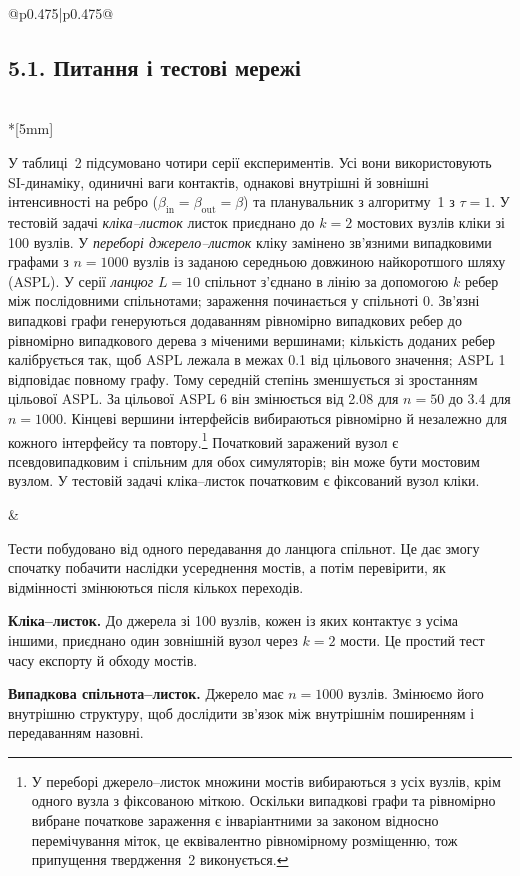 \documentclass[11pt]{article}
\begin{document}
\begin{longtable}{@{}p{0.475\textwidth}|p{0.475\textwidth}@{}}
\begin{minipage}[t]{\linewidth}
\subsection*{5.1. Питання і тестові мережі}
\end{minipage} \\*[5mm]
\begin{minipage}[t]{\linewidth}
У таблиці~2 підсумовано чотири серії експериментів. Усі вони використовують SI-динаміку, одиничні ваги контактів, однакові внутрішні й зовнішні інтенсивності на ребро ($\beta_{\mathrm{in}}=\beta_{\mathrm{out}}=\beta$) та планувальник з алгоритму~1 з $\tau=1$. У тестовій задачі \emph{кліка--листок} листок приєднано до $k=2$ мостових вузлів кліки зі 100 вузлів. У \emph{переборі джерело--листок} кліку замінено зв'язними випадковими графами з $n=1000$ вузлів із заданою середньою довжиною найкоротшого шляху (ASPL). У серії \emph{ланцюг} $L=10$ спільнот з'єднано в лінію за допомогою $k$ ребер між послідовними спільнотами; зараження починається у спільноті 0. Зв'язні випадкові графи генеруються додаванням рівномірно випадкових ребер до рівномірно випадкового дерева з міченими вершинами; кількість доданих ребер калібрується так, щоб ASPL лежала в межах 0.1 від цільового значення; ASPL 1 відповідає повному графу. Тому середній степінь зменшується зі зростанням цільової ASPL. За цільової ASPL 6 він змінюється від 2.08 для $n=50$ до 3.4 для $n=1000$. Кінцеві вершини інтерфейсів вибираються рівномірно й незалежно для кожного інтерфейсу та повтору.\footnote{У переборі джерело--листок множини мостів вибираються з усіх вузлів, крім одного вузла з фіксованою міткою. Оскільки випадкові графи та рівномірно вибране початкове зараження є інваріантними за законом відносно перемічування міток, це еквівалентно рівномірному розміщенню, тож припущення твердження~2 виконується.} Початковий заражений вузол є псевдовипадковим і спільним для обох симуляторів; він може бути мостовим вузлом. У тестовій задачі кліка--листок початковим є фіксований вузол кліки.
\end{minipage} &
\begin{minipage}[t]{\linewidth}
Тести побудовано від одного передавання до ланцюга спільнот. Це дає змогу спочатку побачити наслідки усереднення мостів, а потім перевірити, як відмінності змінюються після кількох переходів.
\par \textbf{Кліка--листок.} До джерела зі 100 вузлів, кожен із яких контактує з усіма іншими, приєднано один зовнішній вузол через $k=2$ мости. Це простий тест часу експорту й обходу мостів.
\par \textbf{Випадкова спільнота--листок.} Джерело має $n=1000$ вузлів. Змінюємо його внутрішню структуру, щоб дослідити зв'язок між внутрішнім поширенням і передаванням назовні.

\end{minipage}
\end{longtable}
\end{document}
